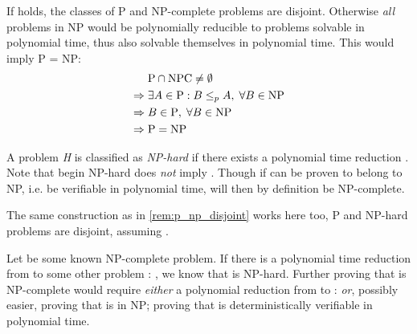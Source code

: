 \begin{remark}\label{rem:p_np_disjoint}
	If \ilmath{\pclass \neq \NP} holds, the classes of P and NP-complete problems are disjoint. Otherwise \emph{all} problems in NP would be polynomially reducible to problems solvable in polynomial time, thus also solvable themselves in polynomial time. This would imply P = NP:
	\begin{align*}
		& \text{P} \cap \text{NPC} \neq \emptyset \\
		\Rightarrow \; & \exists A \in \text{P} : B \leq_p A, \; \forall B \in \text{NP} \\
		\Rightarrow \; & B \in \text{P}, \; \forall B \in \text{NP} \\
		\Rightarrow \; & \text{P} = \text{NP}
	\end{align*}
\end{remark}

\begin{definition}\label{def:np_hard}
	A problem \emph{H} is classified as \emph{NP-hard} if there exists a polynomial time reduction . Note that  begin NP-hard does \emph{not} imply . Though if  can be proven to belong to NP, i.e. be verifiable in polynomial time,  will then by definition be NP-complete.
\end{definition}

\begin{remark}\label{rem:p_np_hard_disjoint}
	The same construction as in \cref{rem:p_np_disjoint} works here too, P and NP-hard problems are disjoint, assuming \ilmath{\pclass \neq \NP}.
\end{remark}

\begin{remark}\label{note:npc_proving}
	Let  be some known NP-complete problem. If there is a polynomial time reduction from  to some other problem : , we know that  is NP-hard. Further proving that  is NP-complete would require \emph{either} a polynomial reduction from  to :  \emph{or}, possibly easier, proving that  is in NP; proving that  is deterministically verifiable in polynomial time.
\end{remark}

